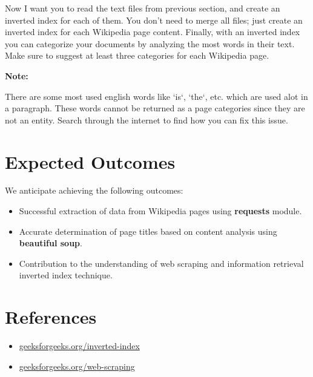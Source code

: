 \documentclass{article}
\newenvironment{suggestion}{
    \par\medskip
    \noindent
    \begin{minipage}{\linewidth}
    \color{lightyellow}
    \textbf{Note:}
}{
    \end{minipage}\par\medskip
}
\begin{document}
Now I want you to read the text files from previous section, and create an inverted index for each of them. You don't need
to merge all files; just create an inverted index for each Wikipedia page content. Finally, with an inverted index you can categorize your documents by analyzing the most words in their text. Make sure to
suggest at least three categories for each Wikipedia page.

\begin{suggestion}
There are some most used english words like `is`, `the`, etc. which are used alot in a paragraph. These words cannot be returned
as a page categories since they are not an entity. Search through the internet to find how you can fix this issue.
\end{suggestion}

\section{Expected Outcomes}
We anticipate achieving the following outcomes:
\begin{itemize}
    \item Successful extraction of data from Wikipedia pages using \textbf{requests} module.
    \item Accurate determination of page titles based on content analysis using \textbf{beautiful soup}.
    \item Contribution to the understanding of web scraping and information retrieval inverted index technique.
\end{itemize}

\section{References}
\begin{itemize}
    \item \href{https://www.geeksforgeeks.org/inverted-index/}{geeksforgeeks.org/inverted-index}
    \item \href{https://www.geeksforgeeks.org/web-scraping-from-wikipedia-using-python-a-complete-guide/}{geeksforgeeks.org/web-scraping}
\end{itemize}
\end{document}
